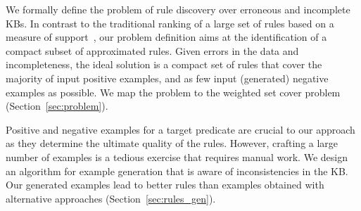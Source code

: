 We formally define the problem of rule discovery over erroneous and incomplete KBs. 
In contrast to the traditional ranking of a large set of rules based on a measure of support~\cite{dehaspe1999discovery,galarraga2015fast,schoenmackers2010learning}, our problem definition aims at the identification of a compact subset of approximated rules. %
Given errors in the data and incompleteness, the ideal solution is a compact set of rules that cover the majority of input positive examples, and as few input (generated) negative examples as possible. We map the problem to the %
weighted set cover problem (Section~\ref{sec:problem}).




Positive and negative examples for a target predicate are crucial to our approach as they determine the ultimate quality of the rules. However, crafting a large number of examples is a tedious exercise that requires manual work. 
We design an algorithm for example generation that is aware of inconsistencies in the KB. Our generated examples lead to better rules than examples obtained with alternative approaches (Section~\ref{sec:rules_gen}). %


